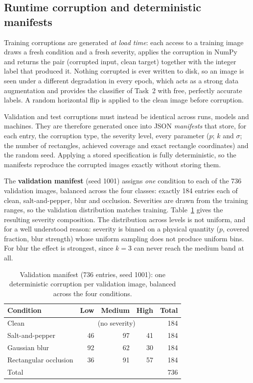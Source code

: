 \documentclass[conference]{IEEEtran}
\begin{document}
\subsection{Runtime corruption and deterministic manifests}

Training corruptions are generated \emph{at load time}: each access to a training
image draws a fresh condition and a fresh severity, applies the corruption in
NumPy and returns the pair (corrupted input, clean target) together with the
integer label that produced it. Nothing corrupted is ever written to disk, so an
image is seen under a different degradation in every epoch, which acts as a
strong data augmentation and provides the classifier of Task~2 with free,
perfectly accurate labels. A random horizontal flip is applied to the clean
image before corruption.

Validation and test corruptions must instead be identical across runs, models
and machines. They are therefore generated once into JSON \emph{manifests} that
store, for each entry, the corruption type, the severity level, every parameter
($p$; $k$ and $\sigma$; the number of rectangles, achieved coverage and exact
rectangle coordinates) and the random seed. Applying a stored specification is
fully deterministic, so the manifests reproduce the corrupted images exactly
without storing them.

The \textbf{validation manifest} (seed 1001) assigns \emph{one} condition to each
of the 736 validation images, balanced across the four classes: exactly 184
entries each of clean, salt-and-pepper, blur and occlusion. Severities are drawn
from the training ranges, so the validation distribution matches training.
Table~\ref{tab:valmanifest} gives the resulting severity composition. The
distribution across levels is not uniform, and for a well understood reason:
severity is binned on a physical quantity ($p$, covered fraction, blur strength)
whose uniform sampling does not produce uniform bins. For blur the effect is
strongest, since $k=3$ can never reach the medium band at all.

\begin{table}[t]
\caption{Validation manifest (736 entries, seed 1001): one deterministic
corruption per validation image, balanced across the four conditions.}
\label{tab:valmanifest}
\centering
\begin{tabular}{@{}lrrrr@{}}
\toprule
Condition & Low & Medium & High & Total \\
\midrule
Clean & \multicolumn{3}{c}{(no severity)} & 184 \\
Salt-and-pepper & 46 & 97 & 41 & 184 \\
Gaussian blur & 92 & 62 & 30 & 184 \\
Rectangular occlusion & 36 & 91 & 57 & 184 \\
\midrule
Total & & & & 736 \\
\bottomrule
\end{tabular}
\end{table}
\end{document}
